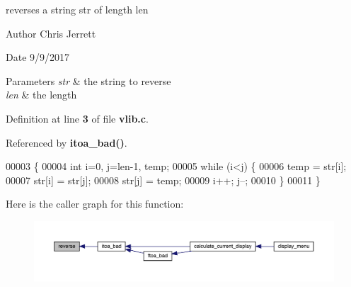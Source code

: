 reverses a string \textquotesingle{}str\textquotesingle{} of length \textquotesingle{}len\textquotesingle{} 

\begin{DoxyAuthor}{Author}
Chris Jerrett 
\end{DoxyAuthor}
\begin{DoxyDate}{Date}
9/9/2017 
\end{DoxyDate}

\begin{DoxyParams}{Parameters}
{\em str} & the string to reverse \\
\hline
{\em len} & the length \\
\hline
\end{DoxyParams}


Definition at line \textbf{ 3} of file \textbf{ vlib.\+c}.



Referenced by \textbf{ itoa\+\_\+bad()}.


\begin{DoxyCode}
00003                                  \{
00004     \textcolor{keywordtype}{int} i=0, j=len-1, temp;
00005     \textcolor{keywordflow}{while} (i<j) \{
00006         temp = str[i];
00007         str[i] = str[j];
00008         str[j] = temp;
00009         i++; j--;
00010     \}
00011 \}
\end{DoxyCode}
Here is the caller graph for this function\+:\nopagebreak
\begin{figure}[H]
\begin{center}
\leavevmode
\includegraphics[width=350pt]{vlib_8c_aad7fea725cb4b198ace1aa3df5051244_icgraph}
\end{center}
\end{figure}
